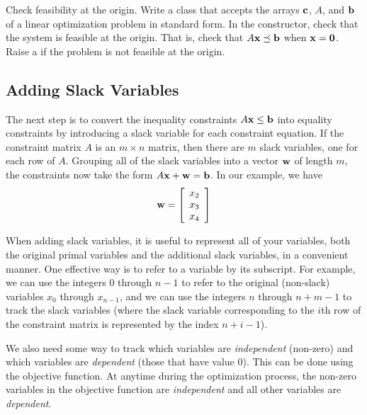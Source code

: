 \begin{problem}{Check feasibility at the origin.}{}
Write a class that accepts the arrays $\mathbf{c}$, $A$, and $\mathbf{b}$ of a linear optimization problem in standard form.
In the constructor, check that the system is feasible at the origin.
That is, check that $A\mathbf{x} \preceq \mathbf{b}$ when $\mathbf{x} = \mathbf{0}$. Raise a  if the problem is not feasible at the origin. \label{prob:initsolver}
\end{problem}

\subsection*{Adding Slack Variables} %

The next step is to convert the inequality constraints $A\mathbf{x} \leq \mathbf{b}$ into equality constraints by introducing a slack variable for each constraint equation.
If the constraint matrix $A$ is an $m \times n$ matrix, then there are $m$ slack variables, one for each row of $A$.
Grouping all of the slack variables into a vector $\mathbf{w}$ of length $m$, the constraints now take the form $A\mathbf{x} + \mathbf{w} = \mathbf{b}$.
In our example, we have \[\mathbf{w} = \left[\begin{array}{c}x_2\\x_3 \\x_4\end{array}\right]\]

When adding slack variables, it is useful to represent all of your variables, both the original primal variables and the additional slack variables, in a convenient manner.
One effective way is to refer to a variable by its subscript.
For example, we can use the integers $0$ through $n-1$ to refer to the original (non-slack) variables $x_0$ through $x_{n-1}$, and we can use the integers $n$ through $n+m-1$ to track the slack variables (where the slack variable corresponding to the $i$th row of the constraint matrix is represented by the index $n+i-1$).

We also need some way to track which variables are \emph{independent} (non-zero) and which variables are \emph{dependent} (those that have value $0$). This can be done using the objective function. At anytime during the optimization process, the non-zero variables in the objective function are \emph{independent} and all other variables are \emph{dependent}. 


